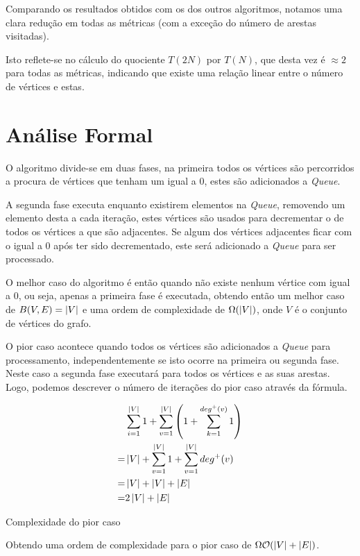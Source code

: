 Comparando os resultados obtidos com os dos outros algoritmos, notamos uma clara
redução em todas as métricas (com a exceção do número de arestas visitadas).

Isto reflete-se no cálculo do quociente $T(2N)$ por $T(N)$, que desta vez é
$\approx 2$ para todas as métricas, indicando que existe uma relação linear
entre o número de vértices e estas.

\section{Análise Formal}

O algoritmo divide-se em duas fases, na primeira todos os vértices são
percorridos a procura de vértices que tenham um  igual a 0,
estes são adicionados a \textit{Queue}.

A segunda fase executa enquanto existirem elementos na \textit{Queue}, removendo
um elemento desta a cada iteração, estes vértices são usados para decrementar o
 de todos os vértices a que são adjacentes. Se algum dos
vértices adjacentes ficar com o  igual a 0 após ter sido
decrementado, este será adicionado a \textit{Queue} para ser processado.

O melhor caso do algoritmo é então quando não existe nenhum vértice com
 igual a 0, ou seja, apenas a primeira fase é executada,
obtendo então um melhor caso de $B(V, E) = \left\lvert V \right\rvert$ e uma ordem de
complexidade de $\Omega(\left\lvert V \right\rvert)$, onde $V$ é o conjunto de vértices do
grafo.

O pior caso acontece quando todos os vértices são adicionados a \textit{Queue}
para processamento, independentemente se isto ocorre na primeira ou segunda
fase. Neste caso a segunda fase executará para todos os vértices e as suas
arestas. Logo, podemos descrever o número de iterações do pior caso através
da fórmula.

\begin{formula}[H]
	\begin{align}
		  & \sum_{i = 1}^{\left\lvert V \right\rvert} 1  + \sum_{v=1}^{\left\lvert V \right\rvert} \left(
		1 + \sum_{k=1}^{deg^+(v)} 1
		\right)                                                       \\
		= & \left\lvert V \right\rvert  + \sum_{v=1}^{\left\lvert V \right\rvert} 1
		+ \sum_{v=1}^{\left\lvert V \right\rvert} deg^+(v)                              \\
		= & \left\lvert V \right\rvert  + \left\lvert V \right\rvert + \left\lvert E \right\rvert                           \\
		= & 2 \left\lvert V \right\rvert + \left\lvert E \right\rvert
	\end{align}
	\caption{Complexidade do pior caso}
\end{formula}

Obtendo uma ordem de complexidade para o pior caso de
$\Omega\mathcal{O}(\left\lvert V \right\rvert + \left\lvert E \right\rvert)$.

